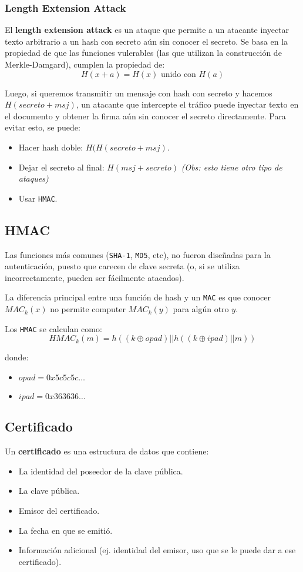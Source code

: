 \subsubsection{Length Extension Attack}
El \textbf{length extension attack} es un ataque que permite a un atacante inyectar texto arbitrario a un hash con secreto aún sin conocer el secreto. Se basa en la propiedad de que las funciones vulerables (las que utilizan la construcción de Merkle-Damgard), cumplen la propiedad de:
$$H(x+a) = H(x) \text{ unido con } H(a)$$

Luego, si queremos transmitir un mensaje con hash con secreto y hacemos $H(secreto + msj)$, un atacante que intercepte el tráfico puede inyectar texto en el documento y obtener la firma aún sin conocer el secreto directamente. Para evitar esto, se puede:

\begin{itemize}
	\item Hacer hash doble: $H(H(secreto+msj)$.
	\item Dejar el secreto al final: $H(msj+secreto)$ \hfill \emph{(Obs: esto tiene otro tipo de ataques)}
	\item Usar \texttt{HMAC}.
\end{itemize}

\subsection{HMAC}
Las funciones más comunes (\texttt{SHA-1}, \texttt{MD5}, etc), no fueron diseñadas para la autenticación, puesto que carecen de clave secreta (o, si se utiliza incorrectamente, pueden ser fácilmente atacados).

La diferencia principal entre una función de hash y un \texttt{MAC} es que conocer $MAC_k(x)$ no permite computer $MAC_k(y)$ para algún otro $y$.

Los \texttt{HMAC} se calculan como:
$$HMAC_k(m) = h ((k\oplus opad) || h ((k\oplus ipad) || m ))$$

donde:
\begin{itemize}
	\item $opad = 0x5c5c5c\hdots$
	\item $ipad = 0x363636\hdots$
\end{itemize}

\subsection{Certificado}
Un \textbf{certificado} es una estructura de datos que contiene:
\begin{itemize}
	\item La identidad del poseedor de la clave pública.
	\item La clave pública.
	\item Emisor del certificado.
	\item La fecha en que se emitió.
	\item Información adicional (ej. identidad del emisor, uso que se le puede dar a ese certificado).
\end{itemize}

